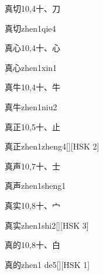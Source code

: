 \begin{entry}{真切}{10,4}{⼗、⼑}
  \begin{phonetics}{真切}{zhen1qie4}
  \end{phonetics}
\end{entry}

\begin{entry}{真心}{10,4}{⼗、⼼}
  \begin{phonetics}{真心}{zhen1xin1}
  \end{phonetics}
\end{entry}

\begin{entry}{真牛}{10,4}{⼗、⽜}
  \begin{phonetics}{真牛}{zhen1niu2}
  \end{phonetics}
\end{entry}

\begin{entry}{真正}{10,5}{⼗、⽌}
  \begin{phonetics}{真正}{zhen1zheng4}[][HSK 2]
  \end{phonetics}
\end{entry}

\begin{entry}{真声}{10,7}{⼗、⼠}
  \begin{phonetics}{真声}{zhen1sheng1}
  \end{phonetics}
\end{entry}

\begin{entry}{真实}{10,8}{⼗、⼧}
  \begin{phonetics}{真实}{zhen1shi2}[][HSK 3]
  \end{phonetics}
\end{entry}

\begin{entry}{真的}{10,8}{⼗、⽩}
  \begin{phonetics}{真的}{zhen1 de5}[][HSK 1]
  \end{phonetics}
\end{entry}

